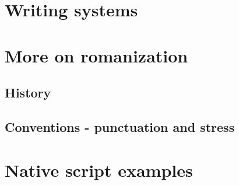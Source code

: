 \section{Writing systems}

\section{More on romanization}
\subsection{History}
\subsection{Conventions - punctuation and stress}

\section{Native script examples}